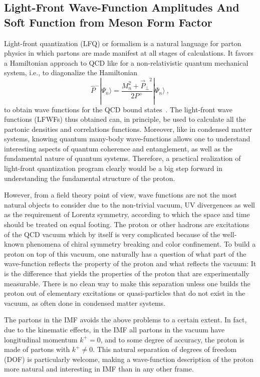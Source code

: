 \documentclass[aps,rmp,reprint,amsmath,amssymb,graphicx,longbibliography]{revtex4-1} %
\begin{document}
\subsection{Light-Front Wave-Function Amplitudes And Soft Function from Meson Form Factor}
\label{sec:others}

Light-front quantization (LFQ) or formalism is a natural language for parton physics
in which partons are made manifest at all stages of calculations. It
favors a Hamiltonian approach to QCD like for a non-relativistic quantum
mechanical system, i.e., to diagonalize the Hamiltonian
\begin{equation}
	\hat P^-|\Psi_n\rangle = \frac{M^2_n+{\vec P_\perp}^2}{2P^+}|\Psi_n\rangle \ ,
\end{equation}
to obtain wave functions for the QCD bound states~\cite{Brodsky:1997de}.
The light-front wave functions (LFWFs) thus obtained can, in principle, be used to calculate
all the partonic densities and correlations functions. Moreover, like in
condensed matter systems, knowing quantum many-body wave-functions
allows one to understand interesting aspects of quantum coherence and
entanglement, as well as the fundamental nature of quantum systems.
Therefore, a practical realization of light-front quantization program clearly would be a big step
forward in understanding the fundamental structure of the proton.


However, from a field theory point of view, wave functions are not the most natural
objects to consider due to the non-trivial vacuum, UV divergences as well as the requirement of Lorentz symmetry, according to which the space and time should be treated on equal footing. The proton or other hadrons are
excitations of the QCD vacuum which by itself is very complicated
because of the well-known phenomena of chiral symmetry breaking and color confinement.
To build a proton on top of this vacuum, one naturally has a question of what part of the
wave-function reflects the property of the proton and what reflects the vacuum:
It is the difference that yields the properties
of the proton that are experimentally measurable. There is no clean way to make
this separation unless one builds the proton out of elementary excitations or quasi-particles that
do not exist in the vacuum, as often done in condensed matter systems.

The partons in the IMF avoids the above problems to a certain extent.
In fact, due to the kinematic effects, in the IMF all partons in
the vacuum have longitudinal momentum $k^+=0$, and to some degree of accuracy,
the proton is made of partons with $k^+\ne 0$. This natural separation of
degrees of freedom (DOF) is particularly welcome, making
a wave-function description of the proton more natural and interesting in IMF
than in any other frame.
\end{document}

